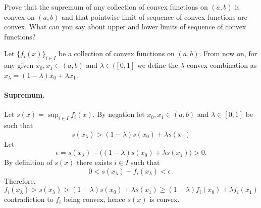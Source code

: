 \begin{enumerate}

\begin{excopy}
Prove that the supremum of any collection of convex functions on \((a,b)\)
is convex on \((a,b)\) and that pointwise limit of sequence of convex
functions are convex.
What can you say about upper and lower limits of sequence of convex functions?
\end{excopy}

Let \(\{f_i(x) \}_{i\in I}\) be a collection of convex functions on \((a,b)\).
From now on, for any given \(x_0,x_1\in(a,b)\) and \(\lambda\in([0,1]\)
we define the \(\lambda\)-convex combination
as \(x_\lambda = (1-\lambda)x_0 + \lambda x_1\).


\paragraph{Supremum.}
Let \(s(x) = \sup_{i\in I}f_i(x)\).
By negation let \(x_0,x_1\in(a,b)\) and \(\lambda\in[0,1]\) be such that
\begin{equation*}
s(x_\lambda) >  (1-\lambda)s(x_0) + \lambda s(x_1)
\end{equation*}
Let
\begin{equation*}
 \epsilon =
   s(x_\lambda) -
   \bigl((1-\lambda)s(x_0) + \lambda s(x_1)\bigl) > 0.
\end{equation*}
By definition of \(s(x)\) there exists \(i\in I\) such that
\begin{equation*}
 0 < s(x_\lambda) - f_i(x_\lambda) < \epsilon\,.
\end{equation*}
Therefore,
\begin{equation*}
f_i(x_\lambda)
> s(x_\lambda)
> (1-\lambda)s(x_0) + \lambda s(x_1)
\geq  (1-\lambda)f_i(x_0) + \lambda f_i(x_1)
\end{equation*}
contradiction to \(f_i\) being convex, hence \(s(x)\) is convex.


\end{enumerate}
